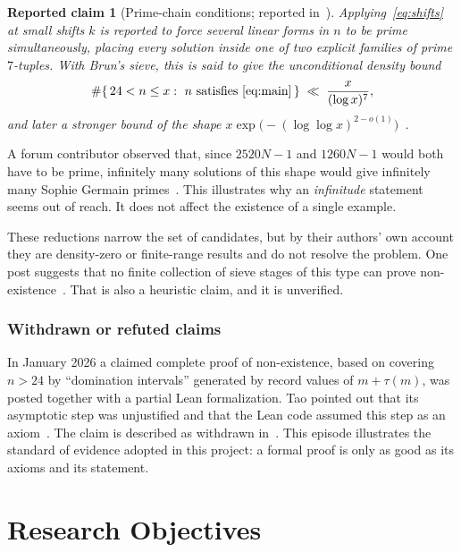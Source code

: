 \documentclass[11pt]{amsart}
\theoremstyle{plain}
\newtheorem{claim}[theorem]{Reported claim}
\theoremstyle{definition}
\theoremstyle{remark}
\numberwithin{equation}{section}
\begin{document}
\begin{claim}[Prime-chain conditions; reported in~\cite{Forum647}]\label{claim:chain}
Applying~\eqref{eq:shifts} at small shifts $k$ is reported to force several linear forms in $n$ to be prime simultaneously, placing every solution inside one of two explicit families of prime $7$-tuples. With Brun's sieve, this is said to give the unconditional density bound
\[
  \#\{\,24<n\le x:\ n \text{ satisfies~\eqref{eq:main}}\,\}\;\ll\; \frac{x}{(\log x)^{7}},
\]
and later a stronger bound of the shape $x\exp\bigl(-(\log\log x)^{2-o(1)}\bigr)$~\cite{Hughes2026}.
\end{claim}

A forum contributor observed that, since $2520N-1$ and $1260N-1$ would both have to be prime, infinitely many solutions of this shape would give infinitely many Sophie Germain primes~\cite{Forum647}. This illustrates why an \emph{infinitude} statement seems out of reach. It does not affect the existence of a single example.

These reductions narrow the set of candidates, but by their authors' own account they are density-zero or finite-range results and do not resolve the problem. One post suggests that no finite collection of sieve stages of this type can prove non-existence~\cite{Forum647}. That is also a heuristic claim, and it is unverified.

\subsubsection*{Withdrawn or refuted claims}
In January 2026 a claimed complete proof of non-existence, based on covering $n>24$ by ``domination intervals'' generated by record values of $m+\tau(m)$, was posted together with a partial Lean formalization. Tao pointed out that its asymptotic step was unjustified and that the Lean code assumed this step as an axiom~\cite{Forum647}. The claim is described as withdrawn in~\cite{MianSiddique2026}. This episode illustrates the standard of evidence adopted in this project: a formal proof is only as good as its axioms and its statement.

\section{Research Objectives}\label{sec:objectives}
\end{document}
